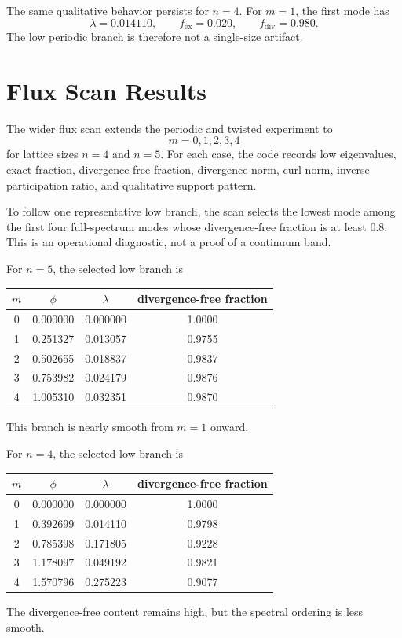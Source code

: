 \documentclass[11pt]{article}
\begin{document}
The same qualitative behavior persists for $n=4$. For $m=1$, the first mode has
\begin{equation}
\lambda = 0.014110,
\qquad
f_{\mathrm{ex}} = 0.020,
\qquad
f_{\mathrm{div}} = 0.980.
\end{equation}
The low periodic branch is therefore not a single-size artifact.

\section{Flux Scan Results}
The wider flux scan extends the periodic and twisted experiment to
\begin{equation}
m = 0,1,2,3,4
\end{equation}
for lattice sizes $n=4$ and $n=5$. For each case, the code records low eigenvalues, exact fraction, divergence-free fraction, divergence norm, curl norm, inverse participation ratio, and qualitative support pattern.

To follow one representative low branch, the scan selects the lowest mode among the first four full-spectrum modes whose divergence-free fraction is at least $0.8$. This is an operational diagnostic, not a proof of a continuum band.

For $n=5$, the selected low branch is
\begin{center}
\begin{tabular}{@{}cccc@{}}
\toprule
$m$ & $\phi$ & $\lambda$ & divergence-free fraction \\
\midrule
0 & 0.000000 & 0.000000 & 1.0000 \\
1 & 0.251327 & 0.013057 & 0.9755 \\
2 & 0.502655 & 0.018837 & 0.9837 \\
3 & 0.753982 & 0.024179 & 0.9876 \\
4 & 1.005310 & 0.032351 & 0.9870 \\
\bottomrule
\end{tabular}
\end{center}
This branch is nearly smooth from $m=1$ onward.

For $n=4$, the selected low branch is
\begin{center}
\begin{tabular}{@{}cccc@{}}
\toprule
$m$ & $\phi$ & $\lambda$ & divergence-free fraction \\
\midrule
0 & 0.000000 & 0.000000 & 1.0000 \\
1 & 0.392699 & 0.014110 & 0.9798 \\
2 & 0.785398 & 0.171805 & 0.9228 \\
3 & 1.178097 & 0.049192 & 0.9821 \\
4 & 1.570796 & 0.275223 & 0.9077 \\
\bottomrule
\end{tabular}
\end{center}
The divergence-free content remains high, but the spectral ordering is less smooth.
\end{document}
